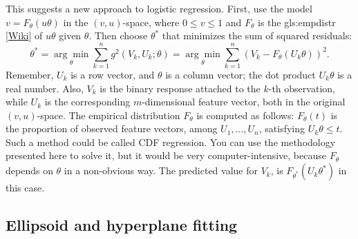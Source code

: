 \documentclass[oneside,10pt]{book}
\begin{document}
This suggests a new approach to logistic regression. First, use the model $v=F_\theta(u\theta)$ in the $(v,u)$-space, where $0\leq v\leq 1$ and
$F_\theta$ is the
\gls{gls:empdistr}
 [\href{https://en.wikipedia.org/wiki/Empirical_distribution_function}{Wiki}] of $u\theta$ given $\theta$. Then choose $\theta^*$ that minimizes the sum of squared residuals:
$$
\theta^* =\underset{\theta}{\arg\min}\sum_{k=1}^n g^2(V_k,U_k;\theta)=\underset{\theta}{\arg\min}\sum_{k=1}^n (V_k - F_\theta(U_k\theta))^2.
$$
 Remember, $U_k$ is a row vector, and $\theta$ is a column vector; the dot product $U_k\theta$ is a real number. Also,
 $V_k$ is the binary response attached to the $k$-th observation, while $U_k$ is the corresponding $m$-dimensional feature vector, both in the original
 $(v,u)$-space. The empirical distribution $F_\theta$ is computed as follows: $F_\theta(t)$ is the proportion of observed feature vectors, among $U_1,\dots,U_n$, satisfying  $U_k\theta\leq t$.
Such a method could be called \textcolor{index}{CDF regression}. You can use the methodology presented here to solve it, but it would be very computer-intensive, because $F_\theta$ depends on $\theta$
 in a non-obvious way. The predicted value for $V_k$, is $F_{\theta^*}(U_k\theta^*)$ in this case.


\subsection{Ellipsoid and hyperplane fitting}
\end{document}
